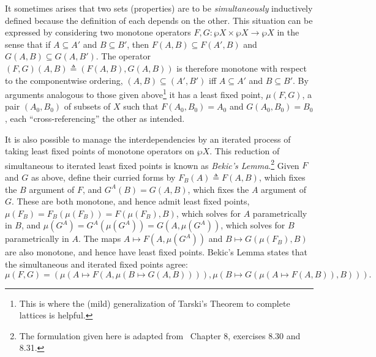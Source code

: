 \documentclass[11pt,twoside]{article}
\newcommand{\eqdef}{\mathrel{\triangleq}}
\begin{document}
It sometimes arises that two sets (properties) are to be \emph{simultaneously} inductively
defined because the definition of each depends on the other.  This situation can be
expressed by considering two monotone operators $F, G : \wp{X}\times\wp{X}\to\wp{X}$ in the sense that
if $A\subseteq A'$ and $B\subseteq B'$, then $F(A,B)\subseteq F(A',B)$ and
$G(A,B)\subseteq G(A,B')$.  The operator $(F,G)(A,B)\eqdef (F(A,B),G(A,B))$ is therefore monotone
with respect to the componentwise ordering, $(A,B)\subseteq (A',B')$ iff $A\subseteq A'$ and
$B\subseteq B'$.  By arguments analogous to those given above\footnote{This is where the (mild)
  generalization of Tarski's Theorem to complete lattices is helpful.} it has a least
fixed point, $\mu(F, G)$, a pair $(A_{0},B_{0})$ of subsets of $X$ such that
$F(A_{0},B_{0})=A_{0}$ and $G(A_{0},B_{0})=B_{0}$, each ``cross-referencing'' the other as
intended.

It is also possible to manage the interdependencies by an iterated process of taking least
fixed points of monotone operators on $\wp{X}$.  This reduction of simultaneous to iterated
least fixed points is known as \emph{Bekic's Lemma}.\footnote{The formulation given here
  is adapted from~\citet{davey-priestley} Chapter 8, exercises 8.30 and 8.31.}  Given $F$
and $G$ as above, define their curried forms by $F_{B}(A)\eqdef{} F(A,B)$, which fixes the
$B$ argument of $F$, and $G^{A}(B)=G(A,B)$, which fixes the $A$ argument of $G$.  These
are both monotone, and hence admit least fixed points,
$\mu(F_{B})=F_{B}(\mu(F_{B}))=F(\mu(F_{B}),B)$, which solves for $A$ parametrically in
$B$, and $\mu(G^{A})=G^{A}(\mu(G^{A}))=G(A,\mu(G^{A}))$, which solves for $B$ parametrically in
$A$.  The maps $A\mapsto F(A,\mu(G^{A}))$ and $B\mapsto G(\mu(F_{B}),B)$ are also monotone, and hence have
least fixed points.  Bekic's Lemma states that the simultaneous and iterated fixed points
agree:
$$\mu(F,G) = (\mu(A\mapsto F(A,\mu(B\mapsto G(A,B)))),\mu(B\mapsto G(\mu(A\mapsto F(A,B)),B))).$$
\end{document}
